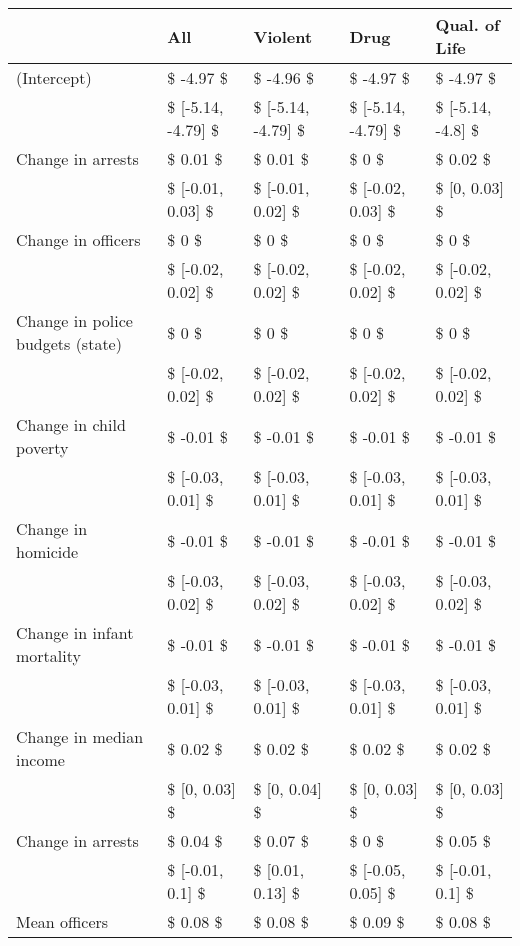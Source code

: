 \begin{table}[ht]
\centering
\begin{tabular}{lllll}
  \hline
  & All & Violent & Drug & Qual. of Life \\ 
  \hline
(Intercept) & \$ -4.97 \$ & \$ -4.96 \$ & \$ -4.97 \$ & \$ -4.97 \$ \\ 
   & \$ [-5.14, -4.79] \$ & \$ [-5.14, -4.79] \$ & \$ [-5.14, -4.79] \$ & \$ [-5.14, -4.8] \$ \\ 
  Change in arrests & \$ 0.01 \$ & \$ 0.01 \$ & \$ 0 \$ & \$ 0.02 \$ \\ 
   & \$ [-0.01, 0.03] \$ & \$ [-0.01, 0.02] \$ & \$ [-0.02, 0.03] \$ & \$ [0, 0.03] \$ \\ 
  Change in officers & \$ 0 \$ & \$ 0 \$ & \$ 0 \$ & \$ 0 \$ \\ 
   & \$ [-0.02, 0.02] \$ & \$ [-0.02, 0.02] \$ & \$ [-0.02, 0.02] \$ & \$ [-0.02, 0.02] \$ \\ 
  Change in police budgets (state) & \$ 0 \$ & \$ 0 \$ & \$ 0 \$ & \$ 0 \$ \\ 
   & \$ [-0.02, 0.02] \$ & \$ [-0.02, 0.02] \$ & \$ [-0.02, 0.02] \$ & \$ [-0.02, 0.02] \$ \\ 
  Change in child poverty & \$ -0.01 \$ & \$ -0.01 \$ & \$ -0.01 \$ & \$ -0.01 \$ \\ 
   & \$ [-0.03, 0.01] \$ & \$ [-0.03, 0.01] \$ & \$ [-0.03, 0.01] \$ & \$ [-0.03, 0.01] \$ \\ 
  Change in homicide & \$ -0.01 \$ & \$ -0.01 \$ & \$ -0.01 \$ & \$ -0.01 \$ \\ 
   & \$ [-0.03, 0.02] \$ & \$ [-0.03, 0.02] \$ & \$ [-0.03, 0.02] \$ & \$ [-0.03, 0.02] \$ \\ 
  Change in infant mortality & \$ -0.01 \$ & \$ -0.01 \$ & \$ -0.01 \$ & \$ -0.01 \$ \\ 
   & \$ [-0.03, 0.01] \$ & \$ [-0.03, 0.01] \$ & \$ [-0.03, 0.01] \$ & \$ [-0.03, 0.01] \$ \\ 
  Change in median income & \$ 0.02 \$ & \$ 0.02 \$ & \$ 0.02 \$ & \$ 0.02 \$ \\ 
   & \$ [0, 0.03] \$ & \$ [0, 0.04] \$ & \$ [0, 0.03] \$ & \$ [0, 0.03] \$ \\ 
  Change in arrests & \$ 0.04 \$ & \$ 0.07 \$ & \$ 0 \$ & \$ 0.05 \$ \\ 
   & \$ [-0.01, 0.1] \$ & \$ [0.01, 0.13] \$ & \$ [-0.05, 0.05] \$ & \$ [-0.01, 0.1] \$ \\ 
  Mean officers & \$ 0.08 \$ & \$ 0.08 \$ & \$ 0.09 \$ & \$ 0.08 \$ \\ 

\end{tabular}
\end{table}
